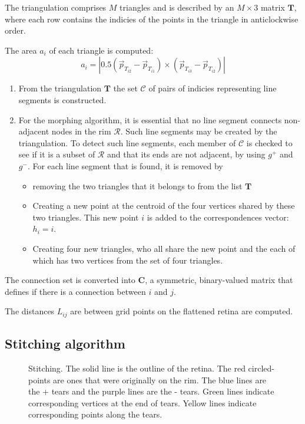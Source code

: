 \documentclass{article}
\begin{document}
The triangulation comprises $M$ triangles and is described by an
$M\times3$ matrix $\mathbf{T}$, where each row contains the indicies
of the points in the triangle in anticlockwise order.

The area $a_i$ of each triangle is computed:
\begin{displaymath}
  a_i = |0.5 (\vec{p}_{T_{i2}}-\vec{p}_{T_{i1}})\times
  (\vec{p}_{T_{i3}}-\vec{p}_{T_{i2}})|
\end{displaymath}

\begin{enumerate}
\item From the triangulation $\mathbf{T}$ the set $\mathcal{C}$ of pairs of
  indicies representing line segments is constructed.
\item For the morphing algorithm, it is essential that no line segment
  connects non-adjacent nodes in the rim $\mathcal{R}$. Such line
  segments may be created by the triangulation. To detect such line
  segments, each member of $\mathcal{C}$ is checked to see if it is a
  subset of $\mathcal{R}$ and that its ends are not adjacent, by
  using $g^+$ and $g^-$. For each line segment that is found, it is
  removed by
  \begin{itemize}
  \item removing the two triangles that it belongs to from the list
    $\mathbf{T}$
  \item Creating a new point at the centroid of the four vertices
    shared by these two triangles. This new point $i$ is added to the
    correspondences vector: $h_i=i$.
  \item Creating four new triangles, who all share the new point and
    the each of which has two vertices from the set of four
    triangles.
  \end{itemize}
\end{enumerate}

The connection set is converted into $\mathbf{C}$, a symmetric,
binary-valued matrix that defines if there is a connection between $i$
and $j$.  

The distances $L_{ij}$ are between grid points on the flattened retina
are computed.

\subsection{Stitching algorithm}
\label{fold-sphere:sec:stitching-algorithm}

\begin{figure}[tp]
  \centering
  \caption{Stitching. The solid line is the outline of the retina. The
    red circled-points are ones that were originally on the rim. The
    blue lines are the + tears and the purple lines are the - tears.
    Green lines indicate corresponding vertices at the end of tears.
    Yellow lines indicate corresponding points along the tears. }
  \label{fold-sphere:fig:stitch}
\end{figure}
\end{document}
